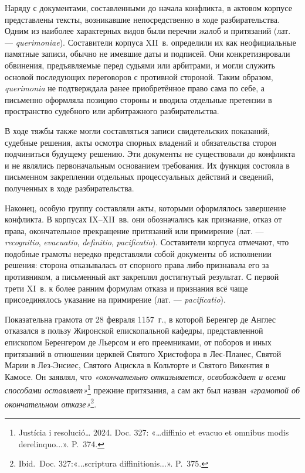 Наряду с документами, составленными до начала конфликта, в актовом корпусе представлены тексты, возникавшие непосредственно в ходе разбирательства. Одним из наиболее характерных видов были перечни жалоб и притязаний (лат. --- \emph{querimoniae}). Составители корпуса XII~в. определили их как неофициальные памятные записи, обычно не имевшие даты и подписей. Они конкретизировали обвинения, предъявляемые перед судьями или арбитрами, и могли служить основой последующих переговоров с противной стороной. Таким образом, \emph{querimonia} не подтверждала ранее приобретённое право сама по себе, а письменно оформляла позицию стороны и вводила отдельные претензии в пространство судебного или арбитражного разбирательства.

В ходе тяжбы также могли составляться записи свидетельских показаний, судебные решения, акты осмотра спорных владений и обязательства сторон подчиниться будущему решению. Эти документы не существовали до конфликта и не являлись первоначальным основанием требования. Их функция состояла в письменном закреплении отдельных процессуальных действий и сведений, полученных в ходе разбирательства.

Наконец, особую группу составляли акты, которыми оформлялось завершение конфликта. В корпусах IX--XII~вв. они обозначались как признание, отказ от права, окончательное прекращение притязаний или примирение (лат. --- \emph{recognitio}, \emph{evacuatio}, \emph{definitio}, \emph{pacificatio}). Составители корпуса отмечают, что подобные грамоты нередко представляли собой документы об исполнении решения: сторона отказывалась от спорного права либо признавала его за противником, а письменный акт закреплял достигнутый результат. С первой трети XI~в. к более ранним формулам отказа и признания всё чаще присоединялось указание на примирение (лат. --- \emph{pacificatio}).

Показательна грамота от 28 февраля 1157~г., в которой Беренгер де Англес отказался в пользу Жиронской епископальной кафедры, представленной епископом Беренгером де Льерсом и его преемниками, от поборов и иных притязаний в отношении церквей Святого Христофора в Лес-Планес, Святой Марии в Лез-Энсиес, Святого Ацискла в Кольторте и Святого Викентия в Камосе. Он заявлял, что \emph{«окончательно отказывается, освобождает и всеми способами оставляет»}\footnote{Justícia i resolució… 2024. Doc. 327: «…diffinio et evacuo et omnibus modis derelinquo...». P.~374.} прежние притязания, а сам акт был назван \emph{«грамотой об окончательном отказе»}\footnote{Ibid.~Doc. 327:«...scriptura diffinitionis...». P.~375.}.


